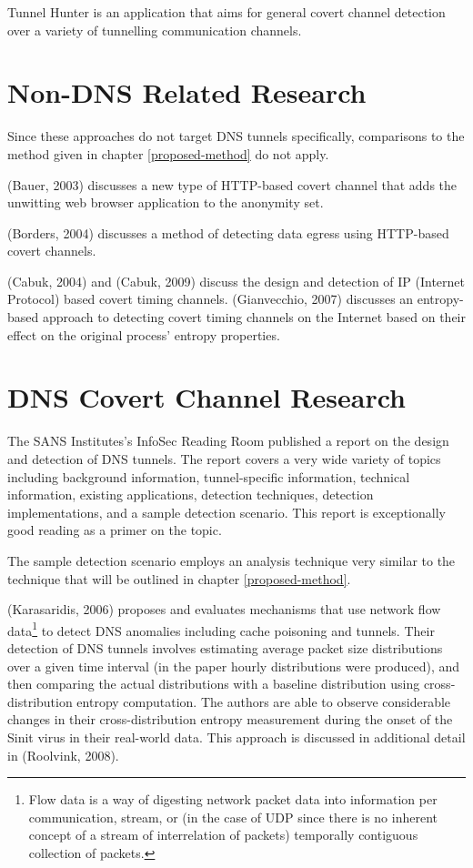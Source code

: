 \documentclass[12pt]{report}
\theoremstyle{remark}
\theoremstyle{definition}
\theoremstyle{definition}
\theoremstyle{definition}
\begin{document}
Tunnel Hunter\cite{Dusi2009} is an application that aims for general covert
channel detection over a variety of tunnelling communication channels.

\section{Non-DNS Related Research} Since these approaches do not target DNS
tunnels specifically, comparisons to the method given in chapter
\ref{proposed-method} do not apply.

(Bauer, 2003)\cite{Bauer2003} discusses a new type of HTTP-based covert channel
that adds the unwitting web browser application to the anonymity set.

(Borders, 2004)\cite{Borders2004} discusses a method of detecting data egress
using HTTP-based covert channels.

(Cabuk, 2004)\cite{Cabuk2004} and (Cabuk, 2009)\cite{Cabuk2009} discuss the
design and detection of IP (Internet Protocol) based covert timing channels.
(Gianvecchio, 2007)\cite{Gianvecchio2007} discusses an entropy-based approach to
detecting covert timing channels on the Internet based on their effect on the
original process' entropy properties.

\section{DNS Covert Channel Research} \label{litreview-dns} The SANS
Institutes's InfoSec Reading Room published a report on the design and detection
of DNS tunnels\cite{SANS2013}. The report covers a very wide variety of topics
including background information, tunnel-specific information, technical
information, existing applications, detection techniques, detection
implementations, and a sample detection scenario. This report is exceptionally
good reading as a primer on the topic.

The sample detection scenario employs an analysis technique very similar to the
technique that will be outlined in chapter \ref{proposed-method}.

(Karasaridis, 2006)\cite{Karasaridis2006} proposes and evaluates mechanisms that
use network flow data\footnote{Flow data is a way of digesting network packet
data into information per communication, stream, or (in the case of UDP since
there is no inherent concept of a stream of interrelation of packets) temporally
contiguous collection of packets.} to detect DNS anomalies including cache
poisoning and tunnels. Their detection of DNS tunnels involves estimating
average packet size distributions over a given time interval (in the paper
hourly distributions were produced), and then comparing the actual distributions
with a baseline distribution using cross-distribution entropy computation. The
authors are able to observe considerable changes in their cross-distribution
entropy measurement during the onset of the Sinit virus in their real-world
data. This approach is discussed in additional detail in (Roolvink,
2008)\cite{Roolvink2008}.
\end{document}
